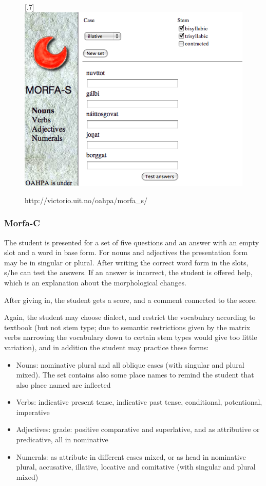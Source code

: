 \documentclass[a4paper,12pt]{article}
\begin{document}
\begin{figure}[htbp]
\begin{center}
\scalebox{.7}[.7]{\includegraphics{img/morfaS.png}}\\
\caption{http://victorio.uit.no/oahpa/morfa\_s/}
\label{morfas}
\end{center}
\end{figure}


\subsubsection{Morfa-C}
The student is presented for a set of five questions and an answer with an empty slot and a word in base form. For nouns and adjectives the presentation form may be in singular or plural. After writing the correct word form in the slots, s/he can test the answers. If an answer is incorrect, the student is offered help, which is an explanation about the morphological changes.

After giving in, the student gets a score, and a comment connected to the score. 

Again, the student may choose dialect, and restrict the vocabulary according to textbook (but not stem type; due to semantic restrictions given by the matrix verbs narrowing the vocabulary down to certain stem types would give too little variation), and in addition the student may practice these forms:
\begin{itemize}
\item Nouns: nominative plural and all oblique cases (with singular and plural mixed). The set contains also some place names to remind the student that also place named are inflected
\item Verbs: indicative present tense, indicative past tense, conditional, potentional, imperative
\item Adjectives: grade: positive comparative and superlative, and as attributive or predicative, all in nominative
\item Numerals: as attribute in different cases mixed, or as head in nominative plural, accusative, illative, locative and comitative (with singular and plural mixed)
\end{itemize}
\vspace{0.5cm}
\end{document}
